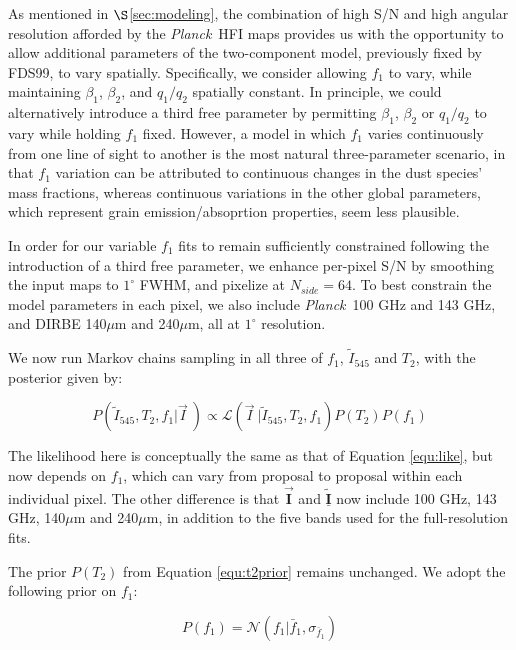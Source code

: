 \documentclass{emulateapj}
\newcommand{\PLANCK}{{\it Planck}}
\begin{document}
As mentioned in $\S$\ref{sec:modeling}, the combination of high S/N and high 
angular resolution afforded by the \PLANCK~HFI maps provides us with the 
opportunity to allow additional parameters of the two-component model, 
previously fixed by FDS99, to vary spatially. Specifically, we consider
allowing $f_1$ to vary, while maintaining $\beta_1$, $\beta_2$, and $q_1/q_2$
spatially constant. In principle, we could alternatively introduce a third free
parameter by permitting $\beta_1$, $\beta_2$ or $q_1/q_2$ to vary while holding
$f_1$ fixed. However, a model in which $f_1$ varies continuously from one line 
of sight to another is the most natural three-parameter scenario, in that $f_1$
variation can be attributed to continuous changes in the dust species' mass
fractions, whereas continuous variations in the other global parameters, which 
represent grain emission/absoprtion properties, seem less plausible.

In order for our variable $f_1$ fits to remain sufficiently constrained 
following the introduction of a third free parameter, we enhance per-pixel S/N 
by smoothing the input maps to $1^{\circ}$ FWHM, and pixelize at $N_{side}=64$.
To best constrain the model parameters in each pixel, we also include 
\PLANCK~100 GHz and 143 GHz, and DIRBE 140$\mu$m and 240$\mu$m, all at 
$1^{\circ}$ resolution.

We now run Markov chains sampling in all three of $f_1$, $\tilde{I}_{545}$ and 
$T_2$, with the posterior given by:

\begin{equation}
\label{eqn:f1post}
P(\tilde{I}_{545}, T_2, f_1|\vec{I}~) \propto \mathcal{L}(\vec{I}~|\tilde{I}_{545}, T_2, f_1)P(T_2)P(f_1)
\end{equation}

The likelihood here is conceptually the same as that of Equation 
\ref{equ:like}, but now depends on $f_1$, which can vary from proposal to 
proposal within each individual pixel. The other difference is that 
$\vec{\mathbf{I}}$ and $\underline{\mathbf{\tilde{I}}}$ now include 100 GHz, 
143 GHz, 140$\mu$m and 240$\mu$m, in addition to the five bands used for the 
full-resolution fits.

The prior $P(T_2)$ from Equation \ref{equ:t2prior} 
remains unchanged. We adopt the following prior on $f_1$:

\begin{equation} \label{equ:f1prior}
P(f_1) = \mathcal{N}(f_1|\bar{f}_1, \sigma_{\bar{f}_1})
\end{equation}
\end{document}
